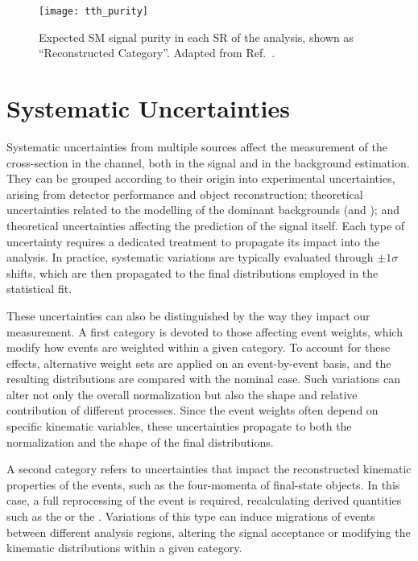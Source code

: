 \begin{figure}[htbp]
  \centering
  \texttt{[image: tth\_purity]}
  \caption{Expected SM \ttHtt signal purity in each SR of the analysis, shown as ``Reconstructed Category''. Adapted from Ref.~\cite{differential_htautau}.}
  \label{fig:tth_purity}
\end{figure}

\section{Systematic Uncertainties}
\label{sec:tth_systematics}

Systematic uncertainties from multiple sources affect the measurement of the \ttH cross-section in the \tauhadhad channel, both in the signal and in the background estimation. They can be grouped according to their origin into experimental uncertainties, arising from detector performance and object reconstruction; theoretical uncertainties related to the modelling of the dominant backgrounds (\ttbar and \ztautau); and theoretical uncertainties affecting the prediction of the \ttH signal itself. Each type of uncertainty requires a dedicated treatment to propagate its impact into the analysis. 
In practice, systematic variations are typically evaluated through $\pm 1\sigma$ shifts, which are then propagated to the final distributions employed in the statistical fit.  

These uncertainties can also be distinguished by the way they impact our measurement. A first category is devoted to those affecting event weights, which modify how events are weighted within a given category. To account for these effects, alternative weight sets are applied on an event-by-event basis, and the resulting distributions are compared with the nominal case. Such variations can alter not only the overall normalization but also the shape and relative contribution of different processes. Since the event weights often depend on specific kinematic variables, these uncertainties propagate to both the normalization and the shape of the final distributions.  

A second category refers to uncertainties that impact the reconstructed kinematic properties of the events, such as the four-momenta of final-state objects. In this case, a full reprocessing of the event is required, recalculating derived quantities such as the \etmiss or the \mmc. Variations of this type can induce migrations of events between different analysis regions, altering the signal acceptance or modifying the kinematic distributions within a given category.  

